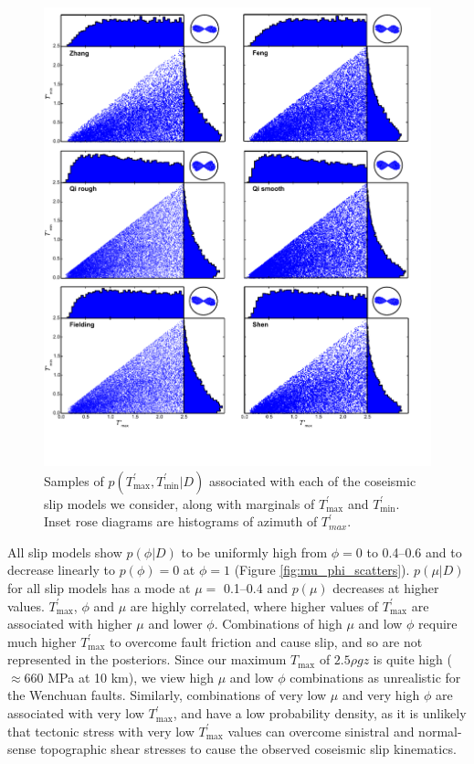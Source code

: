 \documentclass[twocolumn,jgrga]{AGUTeX}
\begin{document}
\begin{article}
\begin{figure}%
\centering
\includegraphics[width=40pc]{../figures/T_scatters.pdf}
\caption{Samples of
$p(T^\prime_{\mathrm{max}},T^\prime_{\mathrm{min}} | D)$ associated with
each of the coseismic slip models we consider, along with marginals of
$T^\prime_{\mathrm{max}}$ and $T^\prime_{\mathrm{min}}$. Inset rose
diagrams are histograms of azimuth of
$T^\prime_{max}$.}
\label{fig:T_scatters}
\end{figure}

All slip models show $p(\phi | D)$ to be uniformly high from $\phi = 0$
to 0.4--0.6 and to decrease linearly to $p(\phi) = 0$ at $\phi = 1$
(Figure \ref{fig:mu_phi_scatters}). $p(\mu | D)$ for all slip models has
a mode at $\mu =$ 0.1--0.4 and $p(\mu)$ decreases at higher values.
$T^\prime_{\mathrm{max}}$, $\phi$ and $\mu$ are highly correlated, where
higher values of $T^\prime_{\mathrm{max}}$ are associated with higher
$\mu$ and lower $\phi$. Combinations of high $\mu$ and low $\phi$
require much higher $T^\prime_{\mathrm{max}}$ to overcome fault friction
and cause slip, and so are not represented in the posteriors. Since our
maximum $T_{\mathrm{max}}$ of $2.5 \rho g z$ is quite high
($\approx 660$ MPa at 10 km), we view high $\mu$ and low $\phi$
combinations as unrealistic for the Wenchuan faults. Similarly,
combinations of very low $\mu$ and very high $\phi$ are associated with
very low $T^\prime_{\mathrm{max}}$, and have a low probability density,
as it is unlikely that tectonic stress with very low $T^\prime_{\mathrm{max}}$
values can
overcome sinistral and normal-sense topographic shear stresses to cause
the observed coseismic slip kinematics.


\end{article}
\end{document}
